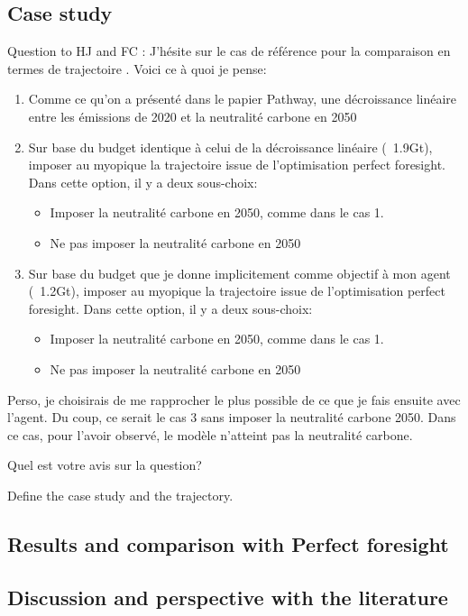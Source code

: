 \subsection{Case study}
{\color{red}Question to HJ and FC : J'hésite sur le cas de référence pour la comparaison en termes de trajectoire . Voici ce à quoi je pense:
\begin{enumerate}
\item Comme ce qu'on a présenté dans le papier Pathway, une décroissance linéaire entre les émissions de 2020 et la neutralité carbone en 2050
\item Sur base du budget  identique à celui de la décroissance linéaire (~1.9Gt), imposer au myopique la trajectoire  issue de l'optimisation perfect foresight. Dans cette option, il y a deux sous-choix:
\begin{itemize}
\item Imposer la neutralité carbone en 2050, comme dans le cas 1.
\item Ne pas imposer la neutralité carbone en 2050
\end{itemize}
\item Sur base du budget  que je donne implicitement comme objectif à mon agent (~1.2Gt), imposer au myopique la trajectoire  issue de l'optimisation perfect foresight. Dans cette option, il y a deux sous-choix:
\begin{itemize}
\item Imposer la neutralité carbone en 2050, comme dans le cas 1.
\item Ne pas imposer la neutralité carbone en 2050
\end{itemize}
\end{enumerate}
Perso, je choisirais de me rapprocher le plus possible de ce que je fais ensuite avec l'agent. Du coup, ce serait le cas 3  sans imposer la neutralité carbone 2050. Dans ce cas, pour l'avoir observé, le modèle n'atteint pas la neutralité carbone. 

Quel est votre avis sur la question?
}

Define the case study and the  trajectory. 

\subsection{Results and comparison with Perfect foresight}

\subsection{Discussion and perspective with the literature} 